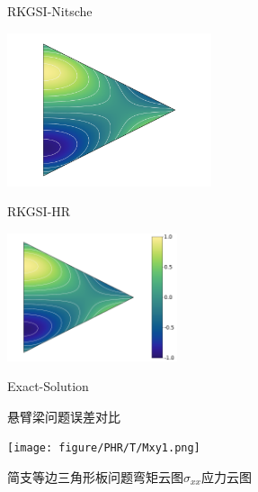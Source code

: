 \begin{figure}[H]
\begin{minipage}[t]{0.48\textwidth}
        \caption*{RKGSI-Nitsche}
\end{minipage}
\begin{minipage}[t]{0.48\textwidth}
    \centering
        \includegraphics[width=6cm]{figure/Mxy/RKGSI-HR.png}
        \caption*{RKGSI-HR}
\end{minipage}
\begin{minipage}[t]{0.48\textwidth}
    \centering
        \includegraphics[width=5cm]{figure/Mxy/Exact-Solution.png}
        \caption*{Exact-Solution}
\end{minipage}
\caption{悬臂梁问题误差对比}
\label{ECLH}
\end{figure}
\begin{figure}[H]
    \centering
        \texttt{[image: figure/PHR/T/Mxy1.png]}
    \caption{简支等边三角形板问题弯矩云图$\sigma_{xx}$应力云图}
    \label{TMxy}
    \end{figure} 

